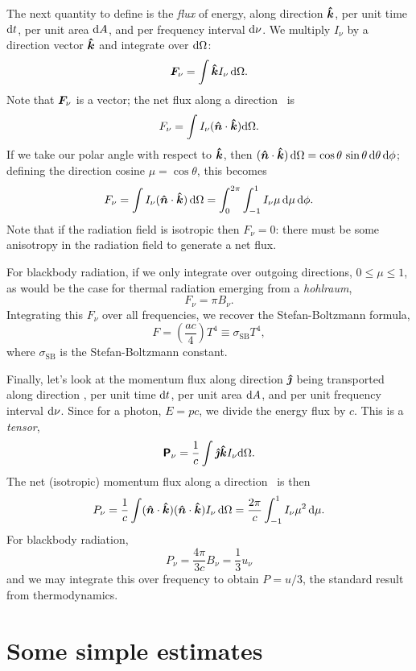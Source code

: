 The next quantity to define is the \emph{flux} of energy, along direction $\boldsymbol{\hat{k}}$, per unit time $\mathrm{d} t$,  per unit area $\mathrm{d} A$, and per frequency interval $\mathrm{d}\nu$. We multiply $I_{\nu}$ by a direction vector $\boldsymbol{\hat{k}}$ and integrate over $\mathrm{d}\Omega$:
\begin{equation}\label{e.radiation-flux}
\boldsymbol{F}_{\nu} = \int \boldsymbol{\hat{k}} I_{\nu} \,\mathrm{d}\Omega.
\end{equation}
Note that $\boldsymbol{F}_{\nu}$ is a vector;  the net flux along a direction \unitn\ is
\[ F_{\nu} = \int I_{\nu}(\boldsymbol{\hat{n}}\cdot\boldsymbol{\hat{k}})\mathrm{d}\Omega. \]
If we take our polar angle with respect to $\boldsymbol{\hat{k}}$, then $(\boldsymbol{\hat{n}}\cdot\boldsymbol{\hat{k}})\,\mathrm{d}\Omega = \cos\theta\,\sin\theta\,\mathrm{d}\theta\,\mathrm{d} \phi$; defining the direction cosine $\mu = \cos\theta$, this becomes 
\[ F_{\nu} = \int I_{\nu} (\boldsymbol{\hat{n}}\cdot\boldsymbol{\hat{k}})\,\mathrm{d}\Omega = \int_{0}^{2\pi} \int_{-1}^{1} I_{\nu}\mu\,\mathrm{d}\mu\,\mathrm{d}\phi. \]
Note that if the radiation field is isotropic then $F_{\nu}=0$: there must be some anisotropy in the radiation field to generate a net flux.

For blackbody radiation, if we only integrate over outgoing directions, $0\le \mu\le 1$, as would be the case for thermal radiation emerging from a \emph{hohlraum},
\[ F_{\nu} = \pi B_{\nu}.\]
Integrating this $F_{\nu}$ over all frequencies, we recover the Stefan-Boltzmann formula,
\[ F = \left(\frac{ac}{4}\right) T^{4} \equiv \sigma_{\mathrm{SB}} T^{4}, \]
where $\sigma_{\mathrm{SB}}$ is the Stefan-Boltzmann constant.

Finally, let's look at the momentum flux along direction $\boldsymbol{\hat{\jmath}}$ being transported along direction \unitk, per unit time $\mathrm{d} t$, per unit area $\mathrm{d} A$, and per unit frequency interval $\mathrm{d}\nu$.  Since for a photon, $E = pc$, we divide the energy flux by $c$.
This is a \emph{tensor},
\begin{equation}\label{e.radiation-pressure-tensor}
\boldsymbol{\mathsf{P}}_{\nu} = \frac{1}{c}\int \boldsymbol{\hat{\jmath}}\boldsymbol{\hat{k}} I_{\nu}\mathrm{d}\Omega.
\end{equation}
The net (isotropic) momentum flux along a direction \unitn\ is then
\[ P_{\nu} = \frac{1}{c}\int (\boldsymbol{\hat{n}}\cdot\boldsymbol{\hat{k}})(\boldsymbol{\hat{n}}\cdot\boldsymbol{\hat{k}}) I_{\nu}\,\mathrm{d} \Omega = \frac{2\pi}{c}\int_{-1}^{1} I_{\nu}\mu^{2}\,\mathrm{d}\mu. \]
For blackbody radiation, 
\[ P_{\nu} = \frac{4\pi}{3c} B_{\nu}  = \frac{1}{3}u_{\nu}\]
and we may integrate this over frequency to obtain $P = u/3$, the standard result from thermodynamics.

\section{Some simple estimates}

